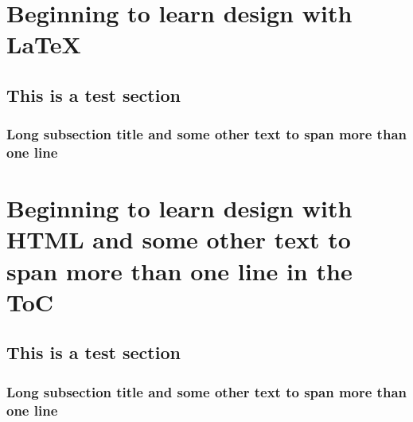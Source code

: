 \documentclass{book}
\begin{document}
\tableofcontents

\chapter{Beginning to learn design with \LaTeX}
\section{This is a test section}
\subsection{Long subsection title and some other text to span more than one line}

\newpage\setcounter{page}{123}%

\chapter{Beginning to learn design with HTML and some other text to span more than one line in the ToC}
\section{This is a test section}
\subsection{Long subsection title and some other text to span more than one line}
\end{document}
